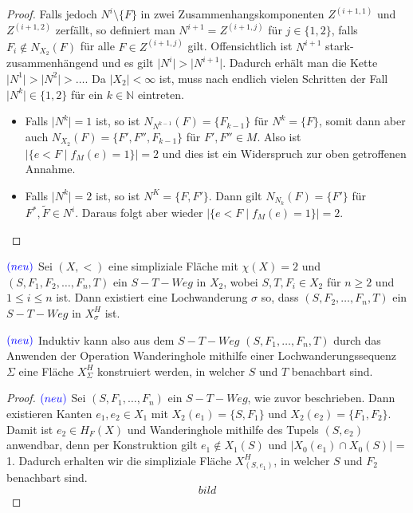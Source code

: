 \documentclass[12pt,titlepage]{article}
\begin{document}
\begin{proof}
 Falls jedoch $N^i \setminus \{F\}$ in zwei Zusammenhangskomponenten $Z^{(i+1,1)}$ und $Z^{(i+1,2)}$ zerfällt, so definiert man $N^{i+1}=Z^{(i+1,j)}$  für $j \in \{1,2\}$, falls $F_{i} \notin N_{X_2}(F)$ für  alle $F \in Z^{(i+1,j)}$ gilt. Offensichtlich ist $N^{i+1}$ stark-zusammenhängend und es gilt $\vert N^{i}\vert >\vert N^{i+1} \vert$. Dadurch erhält man die Kette $\vert N^1 \vert>\vert  N^2 \vert> \ldots$. Da $\vert X_2\vert < \infty$ ist, muss nach endlich vielen Schritten der Fall $\vert N^k \vert \in \{1,2\}$ für ein $k \in \mathbb{N}$ eintreten.
 \begin{itemize}
 \item Falls $\vert N^k \vert=1$ ist, so ist $N_{N^{k-1}}(F)=\{F_{k-1}\}$ für $N^k=\{F\}$, somit dann aber auch $N_{X_2}(F)=\{F',F'',F_{k-1}\}$ für $F',F'' \in M$. Also ist $\vert \{e<F \mid f_M(e)=1\}\vert =2 $ und dies ist ein Widerspruch zur oben getroffenen Annahme.
 \item Falls $\vert N^k \vert=2$ ist, so ist $N^K=\{F,F'\}$. Dann gilt $N_{N_k}(F)=\{F'\}$ für $F^*,\tilde{F} \in N^i$. Daraus folgt aber wieder $\vert \{e<F \mid f_M(e)=1\}\vert =2$.
\end{itemize}
\end{proof}
\begin{lemma} \label{lemma2} $\textcolor{blue}{(neu)}$ 
Sei $(X,<)$ eine simpliziale Fläche mit $\chi(X)=2$ und $(S,F_1,F_2,\ldots,F_n,T)$ ein $S-T-Weg$ in $X_2$, wobei $S,T,F_i \in X_2$ für $n \geq 2$ und $1 \leq i \leq n$ ist. Dann existiert eine Lochwanderung $\sigma$ so, dass $(S,F_2, \ldots,F_n,T)$ ein $S-T-Weg$ in $X^H_{\sigma}$ ist.
\end{lemma}
\begin{bemerkung} $\textcolor{blue}{(neu)}$
Induktiv kann also aus dem $S-T-Weg$ $(S,F_1,\ldots,F_n,T)$ durch das Anwenden der Operation Wanderinghole mithilfe einer Lochwanderungssequenz $\Sigma$ eine Fläche $X^H_{\Sigma}$ konstruiert werden, in welcher $S$ und $T$ benachbart sind.
\end{bemerkung}
\begin{proof} $\textcolor{blue}{(neu)}$
Sei $(S,F_1,\ldots,F_n)$ ein $S-T-Weg$, wie  zuvor beschrieben. Dann existieren Kanten $e_1,e_2 \in X_1$ mit $X_2(e_1)= \{S,F_1\}$ und $X_2(e_2)=\{F_1,F_2\}$. Damit ist $e_2 \in H_F(X)$ und Wanderinghole mithilfe des Tupels $(S,e_2)$ anwendbar, denn per Konstruktion gilt $e_1 \notin X_1(S) $ und $\vert X_0(e_1) \cap X_0(S)\vert$ = 1. Dadurch erhalten wir die simpliziale Fläche $X^H_{(S,e_1)}$, in welcher $S$ und $F_2$ benachbart sind.
\[
bild
\]
\end{proof}
\end{document}

